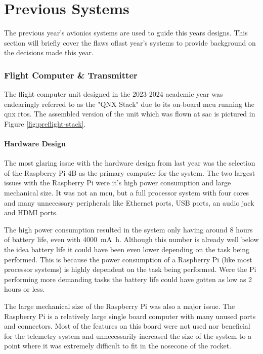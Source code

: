 \part{Previous Systems}

The previous year's avionics systems are used to guide this years designs. This section will briefly cover the flaws
oflast year's systems to provide background on the decisions made this year.

\section{Flight Computer \& Transmitter}

The flight computer unit designed in the 2023-2024 academic year was endearingly referred to as the "QNX Stack" due to
its on-board \gls{mcu} running the \gls{qnx} \gls{rtos}. The assembled version of the unit which was flown at \gls{sac}
is pictured in Figure \ref{fig:preflight-stack}.

\subsection{Hardware Design}

The most glaring issue with the hardware design from last year was the selection of the Raspberry Pi 4B as the primary
computer for the system. The two largest issues with the Raspberry Pi were it's high power consumption and large
mechanical size. It was not an \gls{mcu}, but a full processor system with four cores and many unnecessary peripherals
like Ethernet ports, USB ports, an audio jack and HDMI ports.

The high power consumption resulted in the system only having around 8 hours of battery life, even with
\qty{4000}{\milli\ampere\hour}. Although this number is already well below the idea battery life it could have been even
lower depending on the task being performed. This is because the power consumption of a Raspberry Pi (like most
processor systems) is highly dependent on the task being performed. Were the Pi performing more demanding tasks the
battery life could have gotten as low as 2 hours or less.

The large mechanical size of the Raspberry Pi was also a major issue. The Raspberry Pi is a relatively large single
board computer with many unused ports and connectors. Most of the features on this board were not used nor beneficial
for the telemetry system and unnecessarily increased the size of the system to a point where it was extremely difficult
to fit in the nosecone of the rocket.

